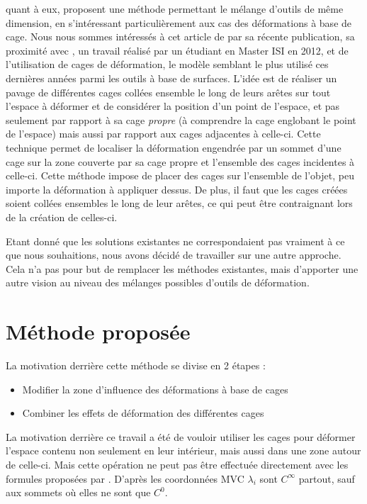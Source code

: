 \cite{GPCP13} quant à eux, proposent une méthode permettant le mélange d'outils
de même dimension, en s'intéressant particulièrement aux cas des déformations à
base de cage. Nous nous sommes intéressés à cet article de par sa récente
publication, sa proximité avec \cite{Hur12}, un travail réalisé par un étudiant
en Master ISI en 2012, et de l'utilisation de cages de déformation, le modèle
semblant le plus utilisé ces dernières années parmi les outils à base de
surfaces. L'idée est de réaliser un pavage de différentes cages collées ensemble
le long de leurs arêtes sur tout l'espace à déformer et de considérer la
position d'un point de l'espace, et pas seulement par rapport à sa cage
\textit{propre} (à comprendre la cage englobant le point de l'espace) mais aussi
par rapport aux cages adjacentes à celle-ci. Cette technique permet de localiser
la déformation engendrée par un sommet d'une cage sur la zone couverte par sa
cage propre et l'ensemble des cages incidentes à celle-ci. Cette méthode impose
de placer des cages sur l'ensemble de l'objet, peu importe la déformation à
appliquer dessus. De plus, il faut que les cages créées soient collées
ensembles le long de leur arêtes, ce qui peut être contraignant lors de la
création de celles-ci.

Etant donné que les solutions existantes ne correspondaient pas vraiment à ce
que nous souhaitions, nous avons décidé de travailler sur une autre approche.
Cela n'a pas pour but de remplacer les méthodes existantes, mais d'apporter une
autre vision au niveau des mélanges possibles d'outils de déformation.

\section{Méthode proposée}

La motivation derrière cette méthode se divise en 2 étapes :

\begin{itemize}
\item Modifier la zone d'influence des déformations à base de cages
\item Combiner les effets de déformation des différentes cages
\end{itemize}

La motivation derrière ce travail a été de vouloir utiliser les cages pour
déformer l'espace contenu non seulement en leur intérieur, mais aussi dans une
zone autour de celle-ci. Mais cette opération ne peut pas être effectuée
directement avec les formules proposées par \cite{Flo03}. D'après \cite{HF06}
les coordonnées MVC $\lambda_i$ sont $C^{\infty}$ partout, sauf aux sommets où
elles ne sont que $C^0$.

